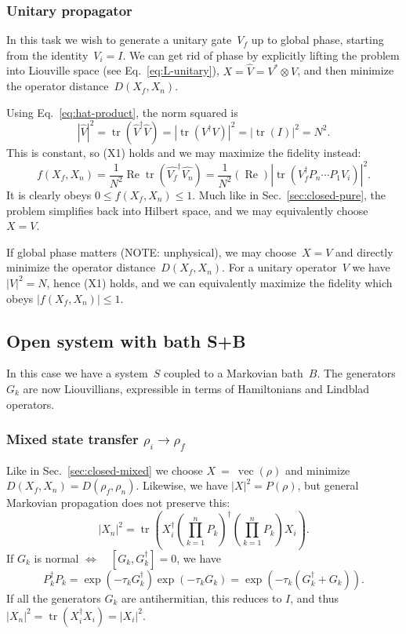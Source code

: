 \documentclass[aps, pra, a4paper, longbibliography]{revtex4}
\newcommand{\I}{I}
\newcommand{\be}{\begin{equation}}
\newcommand{\ee}{\end{equation}}
\newcommand{\eq}{\Leftrightarrow}
\DeclareMathOperator{\tr}{tr}
\DeclareMathOperator{\re}{Re}
\DeclareMathOperator{\cvec}{vec}
\begin{document}
\subsubsection{Unitary propagator}

In this task we wish to generate a unitary gate~$V_f$ up to global
phase, starting from the identity~$V_i = \I$.
We can get rid of phase by explicitly lifting the problem into
Liouville space (see Eq.~\eqref{eq:L-unitary}),
$X = \hat{V} = V^* \otimes V$,
and then minimize the operator distance~$D(X_f, X_n)$.

Using Eq.~\eqref{eq:hat-product}, the norm squared is 
\be
|\hat{V}|^2
= \tr(\hat{V}^\dagger \hat{V})
= |\tr(V^\dagger V)|^2
= |\tr(\I)|^2
= N^2.
\ee
This is constant, so (X1) holds and we may maximize the fidelity instead:
\be
f(X_f, X_n)
= \frac{1}{N^2} \re \tr \left(\hat{V_f}^\dagger \hat{V_n} \right)
= \frac{1}{N^2} (\re) \left| \tr \left(V_f^\dagger P_n \cdots P_1 V_i \right) \right|^2.
\ee
It is clearly obeys $0 \le f(X_f, X_n) \le 1$.
Much like in
Sec.~\ref{sec:closed-pure},
the problem simplifies back into Hilbert space, and we may equivalently
choose~$X = V$.

If global phase matters (NOTE: unphysical), we may choose~$X = V$ and directly minimize
the operator distance~$D(X_f, X_n)$.
For a unitary operator~$V$ we have $|V|^2 = N$, hence (X1) holds, and
we can equivalently maximize the fidelity
which obeys $|f(X_f, X_n)| \le 1$.



\subsection{Open system with bath S+B}

In this case we have a system~$S$ coupled to a Markovian bath~$B$.
The generators~$G_k$ are now Liouvillians, expressible in terms of
Hamiltonians and Lindblad operators.


\subsubsection{Mixed state transfer $\rho_i \to \rho_f$}

Like in Sec.~\ref{sec:closed-mixed} we choose $X~=~\cvec(\rho)$ and
minimize $D(X_f, X_n) = D(\rho_f, \rho_n)$.
Likewise, we have
$|X|^2 = P(\rho)$, but general Markovian propagation does not
preserve this:
\be
|X_n|^2 = \tr\left(X_i^\dagger \left(\prod_{k=1}^{n} P_k\right)^\dagger \left(\prod_{k=1}^{n} P_k\right) X_i\right).
\ee
If $G_k$ is normal $\eq \quad [G_k, G^\dagger_k] = 0$, we have
\be
P_k^\dagger P_k
= \exp(-\tau_k G^\dagger_k) \exp(-\tau_k G_k)
= \exp(-\tau_k (G_k^\dagger + G_k)).
\ee
If all the generators $G_k$ are antihermitian, this reduces to $\I$, and thus
$|X_n|^2 = \tr(X_i^\dagger X_i) = |X_i|^2$.
\end{document}
